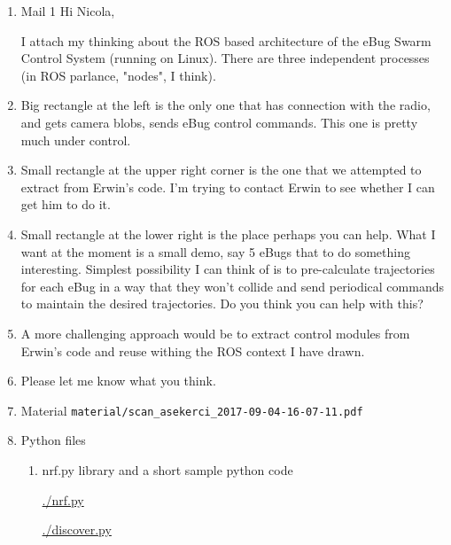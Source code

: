 \documentclass{article}
\begin{document}
\begin{enumerate}
\item Mail 1
\label{sec-2-2-1}
Hi Nicola,

I attach my thinking about the  ROS based architecture of the eBug
Swarm Control System (running on Linux). There are three independent
processes (in ROS parlance, "nodes", I think).
\item 
\label{sec-2-2-2}
Big rectangle at the left is the only one that has connection with the
radio, and gets camera blobs, sends eBug control commands. This one is
pretty much under control.
\item 
\label{sec-2-2-3}
Small rectangle at the upper right corner is the one that we attempted
to extract from Erwin's code. I'm trying to contact Erwin to see
whether I can get him to do it.
\item 
\label{sec-2-2-4}
Small rectangle at the lower right is the place perhaps you can help.
What I want at the moment is a small demo, say 5 eBugs that to do
something interesting. Simplest possibility I can think of is to
pre-calculate trajectories for each eBug in a way that they won't
collide and send periodical commands to maintain the desired
trajectories. Do you think you can help with this?
\item 
\label{sec-2-2-5}
A more challenging approach would be to extract control modules from
Erwin's code and reuse withing the ROS context I have drawn.
\item 
\label{sec-2-2-6}
Please let me know what you think.
\item Material
\label{sec-2-2-7}
\texttt{material/scan\_asekerci\_2017-09-04-16-07-11.pdf}

\item Python files
\label{sec-2-2-8}

\begin{enumerate}
\item nrf.py library and a short sample python code
\label{sec-2-2-8-1}

\url{./nrf.py}

\url{./discover.py}
\end{enumerate}
\end{enumerate}
\end{document}

